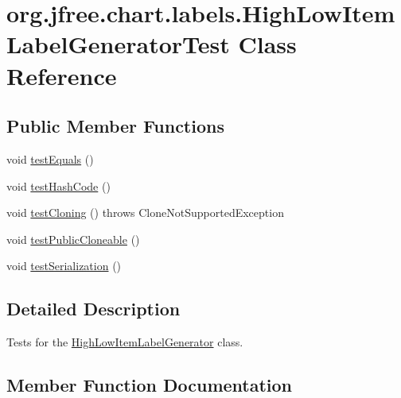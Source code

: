 \hypertarget{classorg_1_1jfree_1_1chart_1_1labels_1_1_high_low_item_label_generator_test}{}\section{org.\+jfree.\+chart.\+labels.\+High\+Low\+Item\+Label\+Generator\+Test Class Reference}
\label{classorg_1_1jfree_1_1chart_1_1labels_1_1_high_low_item_label_generator_test}
\subsection*{Public Member Functions}
\begin{DoxyCompactItemize}
\item 
void \mbox{\hyperlink{classorg_1_1jfree_1_1chart_1_1labels_1_1_high_low_item_label_generator_test_aaa2cc355ea9ab39db8320b2dcac682dd}{test\+Equals}} ()
\item 
void \mbox{\hyperlink{classorg_1_1jfree_1_1chart_1_1labels_1_1_high_low_item_label_generator_test_a64a61e56fab5ba7a443469a644e73bd5}{test\+Hash\+Code}} ()
\item 
void \mbox{\hyperlink{classorg_1_1jfree_1_1chart_1_1labels_1_1_high_low_item_label_generator_test_a90a4f8be63649e9d529509839f9e356e}{test\+Cloning}} ()  throws Clone\+Not\+Supported\+Exception 
\item 
void \mbox{\hyperlink{classorg_1_1jfree_1_1chart_1_1labels_1_1_high_low_item_label_generator_test_a0ec70ca0724df03e52f58c349ebe4d03}{test\+Public\+Cloneable}} ()
\item 
void \mbox{\hyperlink{classorg_1_1jfree_1_1chart_1_1labels_1_1_high_low_item_label_generator_test_a318d56b668189b48673242e6b1598f94}{test\+Serialization}} ()
\end{DoxyCompactItemize}


\subsection{Detailed Description}
Tests for the \mbox{\hyperlink{classorg_1_1jfree_1_1chart_1_1labels_1_1_high_low_item_label_generator}{High\+Low\+Item\+Label\+Generator}} class. 

\subsection{Member Function Documentation}
\mbox{\label{classorg_1_1jfree_1_1chart_1_1labels_1_1_high_low_item_label_generator_test_a90a4f8be63649e9d529509839f9e356e}} 
